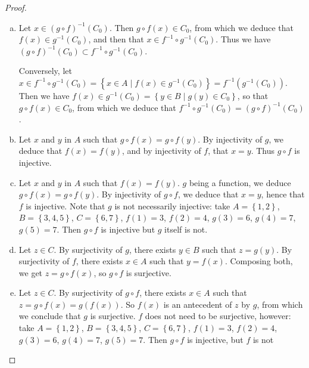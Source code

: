 \documentclass[11pt,a4paper,twoside]{article}
\theoremstyle{definition}
\begin{document}
\begin{proof}\hfill
  \begin{enumerate}[(a)]
  \item Let $x \in \left( g \circ f \right)^{-1} (C_0)$. Then $g \circ f (x) \in C_0$, from which we deduce that $f (x) \in g^{-1} (C_0)$,
    and then that $x \in f^{-1} \circ g^{-1} (C_0)$. Thus we have $(g \circ f)^{-1} (C_0) \subset f^{-1} \circ g^{-1} (C_0)$.

    Conversely, let $x \in f^{-1} \circ g^{-1} (C_0) = \left\{ x \in A \mid f (x) \in g^{-1} (C_0) \right\} = f^{-1} \left( g^{-1} \left( C_0 \right) \right)$.
    Then we have $f (x) \in g^{-1} (C_0) = \left\{ y \in B \mid g (y) \in C_0 \right\}$, so that $g \circ f (x) \in C_0$, from which we deduce that
    $f^{-1} \circ g^{-1} (C_0) = \left( g \circ f \right)^{-1} (C_0)$.

  \item Let $x$ and $y$ in $A$ such that $g \circ f (x) = g \circ f (y)$. By injectivity of $g$, we deduce that $f (x) = f (y)$, and by injectivity of $f$, that
    $x = y$. Thus $g \circ f$ is injective.

  \item Let $x$ and $y$ in $A$  such that $f (x) = f (y)$. $g$ being a function, we deduce $g \circ f (x) = g \circ f (y)$. By injectivity of $g \circ f$,
    we deduce that $x = y$, hence that $f$ is injective. Note that $g$ is not necessarily injective: take $A = \left\{ 1, 2 \right\}$, $B = \left\{ 3, 4, 5 \right\}$, $C = \left\{ 6, 7 \right\}$,
    $f (1) = 3$, $f (2) = 4$, $g (3) = 6$, $g (4) = 7$, $g (5) = 7$. Then $g \circ f$ is injective but $g$ itself is not.

  \item Let $z \in C$. By surjectivity of $g$, there exists $y \in B$ such that $z = g (y)$. By surjectivity of $f$, there exists $x \in A$ such that $y = f (x)$.
    Composing both, we get $z = g \circ f (x)$, so $g \circ f$ is surjective.

  \item Let $z \in C$. By surjectivity of $g \circ f$, there exists $x \in A$ such that $z = g \circ f (x) = g \left( f (x) \right)$.
    So $f (x)$ is an antecedent of $z$ by $g$, from which we conclude that $g$ is surjective. $f$ does not need to be surjective, however:
    take $A = \left\{ 1, 2 \right\}$, $B = \left\{ 3, 4, 5 \right\}$, $C = \left\{ 6, 7 \right\}$, $f (1) = 3$, $f (2) = 4$, $g (3) = 6$, $g (4) = 7$, $g (5) = 7$.
    Then $g \circ f$ is injective, but $f$ is not\qedhere

  \end{enumerate}
\end{proof}
\end{document}
